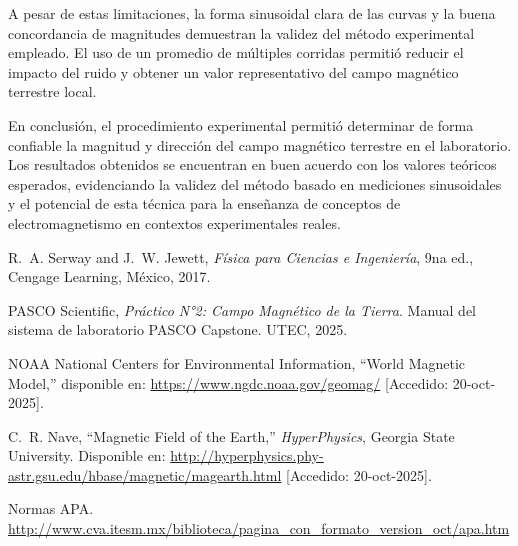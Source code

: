 \documentclass[12pt,a4paper]{article}
\begin{document}
A pesar de estas limitaciones, la forma sinusoidal clara de las curvas y la buena concordancia de magnitudes demuestran la validez del método experimental empleado. El uso de un promedio de múltiples corridas permitió reducir el impacto del ruido y obtener un valor representativo del campo magnético terrestre local.

En conclusión, el procedimiento experimental permitió determinar de forma confiable la magnitud y dirección del campo magnético terrestre en el laboratorio. Los resultados obtenidos se encuentran en buen acuerdo con los valores teóricos esperados, evidenciando la validez del método basado en mediciones sinusoidales y el potencial de esta técnica para la enseñanza de conceptos de electromagnetismo en contextos experimentales reales.


\begin{thebibliography}{9}

R.~A. Serway and J.~W. Jewett, \textit{Física para Ciencias e Ingeniería}, 9na ed., Cengage Learning, México, 2017.

PASCO Scientific, \textit{Práctico N°2: Campo Magnético de la Tierra}. Manual del sistema de laboratorio PASCO Capstone. UTEC, 2025.

NOAA National Centers for Environmental Information, ``World Magnetic Model,'' disponible en: \url{https://www.ngdc.noaa.gov/geomag/} [Accedido: 20-oct-2025].

C.~R. Nave, ``Magnetic Field of the Earth,'' \textit{HyperPhysics}, Georgia State University. Disponible en: \url{http://hyperphysics.phy-astr.gsu.edu/hbase/magnetic/magearth.html} [Accedido: 20-oct-2025].

Normas APA. \url{http://www.cva.itesm.mx/biblioteca/pagina_con_formato_version_oct/apa.htm}

\end{thebibliography}
\end{document}

